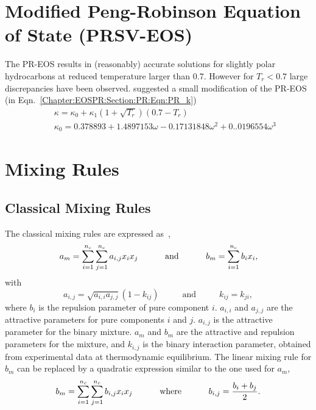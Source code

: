 \section{Modified Peng-Robinson Equation of State (PRSV-EOS)}\label{Chapter:EOSPR:Section:PRSV}
The PR-EOS results in (reasonably) accurate solutions for slightly polar hydrocarbons at reduced temperature larger than $0.7$. However for $T_{r}<0.7$ large discrepancies have been observed. \citet[PRSV-EOS]{stryjek_1986} suggested a small modification of the PR-EOS (\ie in Eqn.~\ref{Chapter:EOSPR:Section:PR:Eqn:PR_k})
   \begin{eqnarray}
     && \kappa = \kappa_{0} + \kappa_{1}\left(1+\sqrt{T_{r}}\right)\left(0.7-T_{r}\right) \\
     && \kappa_{0} = 0.378893 + 1.4897153\omega - 0.17131848\omega^{2} + 0..0196554\omega^{3} \nonumber
   \end{eqnarray}

\section{Mixing Rules}\label{Chapter:EOSPR:Section:MixRules}


\subsection{Classical Mixing Rules}\label{Chapter:EOSPR:Section:MixRules:Classical}
The classical mixing rules are expressed as~\citep{Sandler_Book}, 
  \begin{equation}
    a_{m} = \sum\limits_{i=1}^{n_{c}}\sum\limits_{j=1}^{n_{c}} a_{i,j}x_{i}x_{j}\hspace{1cm}\text{ and }\hspace{1cm} b_{m} = \sum\limits_{i=1}^{n_{c}}b_{i}x_{i},
  \end{equation}
with
  \begin{displaymath}
     a_{i,j}=\sqrt{a_{i,i}a_{j,j}}\left(1-k_{ij}\right) \hspace{1cm}\text{ and }\hspace{1cm} k_{ij}=k_{ji},
  \end{displaymath}
where $b_{i}$ is the repulsion parameter of pure component $i$. $a_{i,i}$ and $a_{j,j}$ are the attractive parameters for pure components $i$ and $j$. $a_{i,j}$ is the attractive parameter for the binary mixture. $a_{m}$ and $b_{m}$ are the attractive and repulsion parameters for the mixture, and $k_{i,j}$ is the binary interaction parameter, obtained from experimental data at thermodynamic equilibrium. The linear mixing rule for $b_{m}$ can be replaced by a quadratic expression similar to the one used for $a_{m}$,
  \begin{equation}
     b_{m} = \sum\limits_{i=1}^{n_{c}}\sum\limits_{j=1}^{n_{c}} b_{i,j}x_{i}x_{j}\hspace{1cm}\text{ where }\hspace{1cm} b_{i,j} = \displaystyle\frac{b_{i}+b_{j}}{2}.
  \end{equation}


